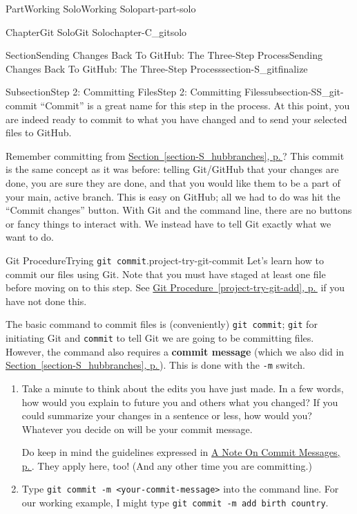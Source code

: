 \documentclass[twoside,10pt,]{book}
\newcommand{\xreffont}{\relax}
\newcommand{\mono}[1]{\texttt{#1}}
\newcommand{\terminology}[1]{\textbf{#1}}
\begin{document}
\begin{partptx}{Part}{Working Solo}{}{Working Solo}{}{}{part-part-solo}
\begin{chapterptx}{Chapter}{Git Solo}{}{Git Solo}{}{}{chapter-C_gitsolo}
\begin{sectionptx}{Section}{Sending Changes Back To GitHub: The Three-Step Process}{}{Sending Changes Back To GitHub: The Three-Step Process}{}{}{section-S_gitfinalize}
\begin{subsectionptx}{Subsection}{Step 2: Committing Files}{}{Step 2: Committing Files}{}{}{subsection-SS_git-commit}
%
%
%
``Commit'' is a great name for this step in the process. At this point, you are indeed ready to commit to what you have changed and to send your selected files to GitHub.%
\par
Remember committing from \hyperref[section-S_hubbranches]{Section~{\xreffont\ref{section-S_hubbranches}}, p.\,\pageref{section-S_hubbranches}}? This commit is the same concept as it was before: telling Git\slash{}GitHub that your changes are done, you are sure they are done, and that you would like them to be a part of your main, active branch. This is easy on GitHub; all we had to do was hit the ``Commit changes'' button. With Git and the command line, there are no buttons or fancy things to interact with. We instead have to tell Git exactly what we want to do.%
\begin{project}{Git Procedure}{Trying \mono{git commit}.}{project-try-git-commit}%
Let's learn how to commit our files using Git. Note that you must have staged at least one file before moving on to this step. See \hyperref[project-try-git-add]{Git Procedure~{\xreffont\ref{project-try-git-add}}, p.\,\pageref{project-try-git-add}} if you have not done this.%
\par
The basic command to commit files is (conveniently) \mono{git commit}; \mono{git} for initiating Git and \mono{commit} to tell Git we are going to be committing files. However, the command also requires a \terminology{commit message} (which we also did in \hyperref[section-S_hubbranches]{Section~{\xreffont\ref{section-S_hubbranches}}, p.\,\pageref{section-S_hubbranches}}). This is done with the \mono{-m} switch.%
\begin{enumerate}[font=\bfseries,label=(\alph*),ref=\alph*]%
\item{}Take a minute to think about the edits you have just made. In a few words, how would you explain to future you and others what you changed? If you could summarize your changes in a sentence or less, how would you? Whatever you decide on will be your commit message.%
\par
Do keep in mind the guidelines expressed in \hyperref[assemblage-commitmessages]{A Note On Commit Messages, p.\,\pageref{assemblage-commitmessages}}. They apply here, too! (And any other time you are committing.)%
\item{}Type \mono{git commit -m \textquotedbl{}<your-commit-message>\textquotedbl{}} into the command line. For our working example, I might type \mono{git commit -m \textquotedbl{}add birth country\textquotedbl{}}.%

\end{enumerate}
\end{project}
\end{subsectionptx}
\end{sectionptx}
\end{chapterptx}
\end{partptx}
\end{document}
